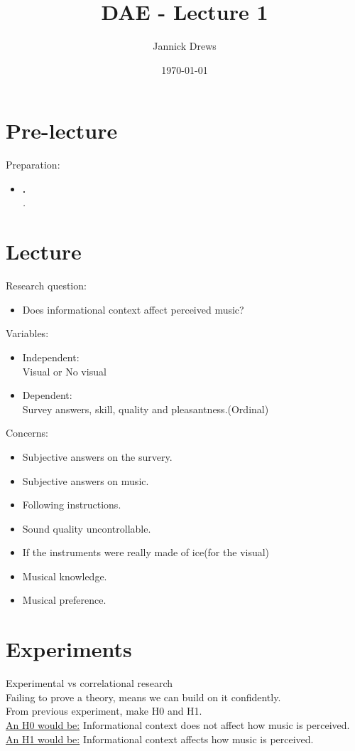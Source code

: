 \documentclass{article}
\title{DAE - Lecture 1}
\author{Jannick Drews}
\date{\today}
\begin{document}
\maketitle
\newpage

\section{Pre-lecture}
Preparation: \\
\begin{itemize}
  \item \textbf{.}\\
    \textit{.}
\end{itemize}

\section{Lecture}
Research question:
\begin{itemize}
    \item Does informational context affect perceived music?
\end{itemize}

Variables:
\begin{itemize}
    \item Independent:\\
        Visual or No visual
    \item Dependent:\\
        Survey answers, skill, quality and pleasantness.(Ordinal)
\end{itemize}

Concerns:
\begin{itemize}
    \item Subjective answers on the survery.
    \item Subjective answers on music.
    \item Following instructions.
    \item Sound quality uncontrollable.
    \item If the instruments were really made of ice(for the visual)
    \item Musical knowledge.
    \item Musical preference.
\end{itemize}

\section{Experiments}
Experimental vs correlational research\\
Failing to prove a theory, means we can build on it confidently.\\
From previous experiment, make H0 and H1.\\
\underline{An H0 would be:} Informational context does not affect how music is perceived.\\
\underline{An H1 would be:} Informational context affects how music is perceived.\medskip
\end{document}
